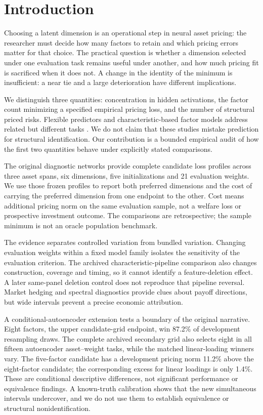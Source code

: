 \section{Introduction}
Choosing a latent dimension is an operational step in neural asset pricing: the researcher must decide how many factors to retain and which pricing errors matter for that choice. The practical question is whether a dimension selected under one evaluation task remains useful under another, and how much pricing fit is sacrificed when it does not. A change in the identity of the minimum is insufficient: a near tie and a large deterioration have different implications.

We distinguish three quantities: concentration in hidden activations, the factor count minimizing a specified empirical pricing loss, and the number of structural priced risks. Flexible predictors and characteristic-based factor models address related but different tasks \citep{kelly2019characteristics,gu2020empirical,gu2021autoencoder,chen2024deep}. We do not claim that these studies mistake prediction for structural identification. Our contribution is a bounded empirical audit of how the first two quantities behave under explicitly stated comparisons.

The original diagnostic networks provide complete candidate loss profiles across three asset spans, six dimensions, five initializations and 21 evaluation weights. We use those frozen profiles to report both preferred dimensions and the cost of carrying the preferred dimension from one endpoint to the other. Cost means additional pricing norm on the same evaluation sample, not a welfare loss or prospective investment outcome. The comparisons are retrospective; the sample minimum is not an oracle population benchmark.

The evidence separates controlled variation from bundled variation. Changing evaluation weights within a fixed model family isolates the sensitivity of the evaluation criterion. The archived characteristic-pipeline comparison also changes construction, coverage and timing, so it cannot identify a feature-deletion effect. A later same-panel deletion control does not reproduce that pipeline reversal. Market hedging and spectral diagnostics provide clues about payoff directions, but wide intervals prevent a precise economic attribution.

A conditional-autoencoder extension tests a boundary of the original narrative. Eight factors, the upper candidate-grid endpoint, win 87.2\% of development resampling draws. The complete archived secondary grid also selects eight in all fifteen autoencoder asset--weight tasks, while the matched linear-loading winners vary. The five-factor candidate has a development pricing norm 11.2\% above the eight-factor candidate; the corresponding excess for linear loadings is only 1.4\%. These are conditional descriptive differences, not significant performance or equivalence findings. A known-truth calibration shows that the new simultaneous intervals undercover, and we do not use them to establish equivalence or structural nonidentification.

